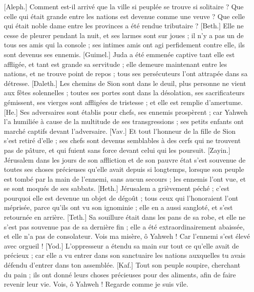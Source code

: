 \begin{multicols}{2}
\VerseOne{}[Aleph.] Comment est-il arrivé que la ville si peuplée se trouve si solitaire ? Que celle qui était grande entre les nations est devenue comme une veuve ? Que celle qui était noble dame entre les provinces a été rendue tributaire ?
[Beth.] Elle ne cesse de pleurer pendant la nuit, et ses larmes sont sur joues ; il n'y a pas un de tous ses amis qui la console ; ses intimes amis ont agi perfidement contre elle, ils sont devenus ses ennemis.
[Guimel.] Juda a été emmenée captive tant elle est affligée, et tant est grande sa servitude ; elle demeure maintenant entre les nations, et ne trouve point de repos ; tous ses persécuteurs l'ont attrapée dans sa détresse.
[Daleth.] Les chemins de Sion sont dans le deuil, plus personne ne vient aux fêtes solennelles ; toutes ses portes sont dans la désolation, ses sacrificateurs gémissent, ses vierges sont affligées de tristesse ; et elle est remplie d'amertume.
[He.] Ses adversaires sont établis pour chefs, ses ennemis prospèrent ; car Yahweh l'a humiliée à cause de la multitude de ses transgressions ; ses petits enfants ont marché captifs devant l'adversaire.
[Vav.] Et tout l'honneur de la fille de Sion s'est retiré d'elle ; ses chefs sont devenus semblables à des cerfs qui ne trouvent pas de pâture, et qui fuient sans force devant celui qui les poursuit.
[Zayin.] Jérusalem dans les jours de son affliction et de son pauvre état s’est souvenue de toutes ses choses précieuses qu’elle avait depuis si longtemps, lorsque son peuple est tombé par la main de l’ennemi, sans aucun secours ; les ennemis l’ont vue, et se sont moqués de ses sabbats.
[Heth.] Jérusalem a grièvement péché ; c'est pourquoi elle est devenue un objet de dégoût ; tous ceux qui l'honoraient l'ont méprisée, parce qu'ils ont vu son ignominie ; elle en a aussi sangloté, et s'est retournée en arrière.
[Teth.] Sa souillure était dans les pans de sa robe, et elle ne s'est pas souvenue pas de sa dernière fin ; elle a été extraordinairement abaissée, et elle n'a pas de consolateur. Vois ma misère, ô Yahweh ! Car l'ennemi s'est élevé avec orgueil !
[Yod.] L’oppresseur a étendu sa main sur tout ce qu’elle avait de précieux ; car elle a vu entrer dans son sanctuaire les nations auxquelles tu avais défendu d’entrer dans ton assemblée.
[Kaf.] Tout son peuple soupire, cherchant du pain ; ils ont donné leurs choses précieuses pour des aliments, afin de faire revenir leur vie. Vois, ô Yahweh ! Regarde comme je suis vile.

\end{multicols}
